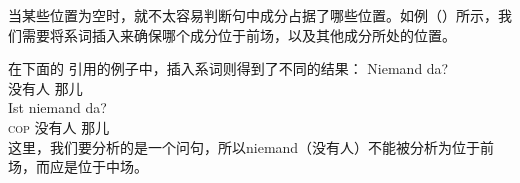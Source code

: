 当某些位置为空时，就不太容易判断句中成分占据了哪些位置。如例（）所示，我们需要将系词插入来确保哪个成分位于前场，以及其他成分所处的位置。

在下面的 \citet[]{Paul1919a}引用的例子中，插入系词则得到了不同的结果：
\eal
\ex 
\gll Niemand da?\\
	 没有人 那儿\\
\ex 
\gll Ist niemand da?\\
	 \textsc{cop} 没有人 那儿\\
\zl
这里，我们要分析的是一个问句，所以niemand（没有人）不能被分析为位于前场，而应是位于中场。

